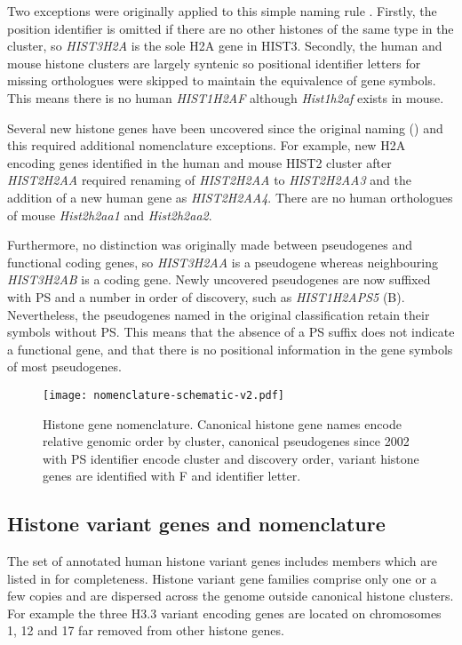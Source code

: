 	Two exceptions were originally applied to this simple naming rule \citep{Marzluff02}. 
	Firstly, the position identifier is omitted if there are no other histones of the same type in the cluster, 
	so \textit{HIST3H2A} is the sole H2A gene in HIST3. 
	Secondly, the human and mouse histone clusters are largely syntenic 
	so positional identifier letters for missing orthologues were skipped to maintain the equivalence of gene symbols.
	This means there is no human \textit{HIST1H2AF} although \textit{Hist1h2af} exists in mouse.

	Several new histone genes have been uncovered since the original naming () 
	and this required additional nomenclature exceptions.
	For example, new H2A encoding genes identified in the human and mouse HIST2 cluster after \textit{HIST2H2AA} 
	required renaming of \textit{HIST2H2AA} to \textit{HIST2H2AA3} 
	and the addition of a new human gene as \textit{HIST2H2AA4}. 
	There are no human orthologues of mouse \textit{Hist2h2aa1} and \textit{Hist2h2aa2}.

	Furthermore, no distinction was originally made between pseudogenes and functional coding genes,
	so \textit{HIST3H2AA} is a pseudogene whereas neighbouring \textit{HIST3H2AB} is a coding gene.
	Newly uncovered pseudogenes are now suffixed with PS and a number in order of discovery,
	such as \textit{HIST1H2APS5} (B). 
	Nevertheless, the pseudogenes named in the original classification retain their symbols without PS.
	This means that the absence of a PS suffix does not indicate a functional gene, 
	and that there is no positional information in the gene symbols of most pseudogenes.

\begin{figure*}[hp]
	\centering
	\texttt{[image: nomenclature-schematic-v2.pdf]}
	\caption{Histone gene nomenclature. 
	Canonical histone gene names encode relative genomic order by cluster,
	canonical pseudogenes since 2002 with PS identifier encode cluster and discovery order,
	variant histone genes are identified with F and identifier letter.}
	\label{fig:nomenclature}
\end{figure*}

\subsection{Histone variant genes and nomenclature}
	The set of annotated human histone variant genes 
	includes  members 
	which are listed in  for completeness.
	Histone variant gene families comprise only one or a few copies 
	and are dispersed across the genome outside canonical histone clusters.
	For example the three H3.3 variant encoding genes are located 
	on chromosomes 1, 12 and 17 far removed from other histone genes.


